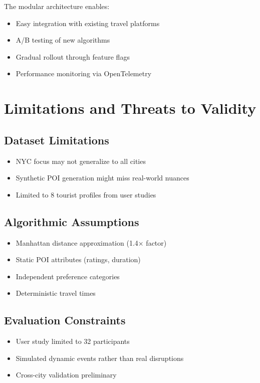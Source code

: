 The modular architecture enables:
\begin{itemize}
    \item Easy integration with existing travel platforms
    \item A/B testing of new algorithms
    \item Gradual rollout through feature flags
    \item Performance monitoring via OpenTelemetry
\end{itemize}

\section{Limitations and Threats to Validity}

\subsection{Dataset Limitations}
\begin{itemize}
    \item NYC focus may not generalize to all cities
    \item Synthetic POI generation might miss real-world nuances
    \item Limited to 8 tourist profiles from user studies
\end{itemize}

\subsection{Algorithmic Assumptions}
\begin{itemize}
    \item Manhattan distance approximation (1.4× factor)
    \item Static POI attributes (ratings, duration)
    \item Independent preference categories
    \item Deterministic travel times
\end{itemize}

\subsection{Evaluation Constraints}
\begin{itemize}
    \item User study limited to 32 participants
    \item Simulated dynamic events rather than real disruptions
    \item Cross-city validation preliminary
\end{itemize}

